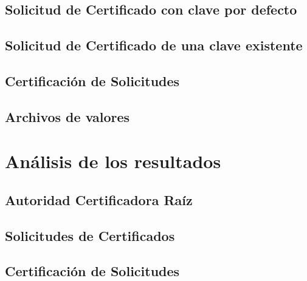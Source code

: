 \documentclass[a4paper, 11pt]{article}
\begin{document}
	\subsection{Solicitud de Certificado con clave por defecto}
	\subsection{Solicitud de Certificado de una clave existente}
	\subsection{Certificación de Solicitudes}
	\subsection{Archivos de valores}
			
\section{Análisis de los resultados}
	\subsection{Autoridad Certificadora Raíz}
	\subsection{Solicitudes de Certificados}
	\subsection{Certificación de Solicitudes}
	
\end{document}
